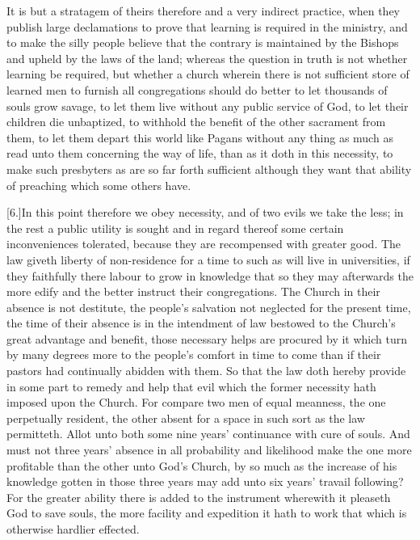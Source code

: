 It is but a stratagem of theirs therefore and a very indirect practice, when they publish large declamations to prove that learning is required in the ministry, and to make the silly people believe that the contrary is maintained by the Bishops and upheld by the laws of the land; whereas the question in truth is not whether learning be required, but whether a church wherein there is not sufficient store of learned men to furnish all congregations should do better to let thousands  of souls grow savage,
 to let them live without any public service of God, to let their children die unbaptized, to withhold the benefit of the other sacrament from them, to let them depart this world like Pagans without any thing as much as read unto them concerning the way of life, than as it doth in this necessity, to make such presbyters as are so far forth sufficient although they want that ability of preaching which some others have.

[6.]In this point therefore we obey necessity, and of two evils we take the less; in the rest a public utility is sought and in regard thereof some certain inconveniences tolerated, because they are recompensed with greater good. The law giveth liberty of non-residence for a time to such as will live in universities, if they faithfully there labour to grow in knowledge that so they may afterwards the more edify and the better instruct their congregations. The Church in their absence is not destitute, the people’s salvation not neglected for the present time, the time of their absence is in the intendment of law bestowed to the Church’s great advantage and benefit, those necessary helps are procured by it which turn by many degrees more to the people’s comfort in time to come than if their pastors had continually abidden with them. So that the law doth hereby provide in some part to remedy and help that evil which the former necessity hath imposed upon the Church. For compare two men of equal meanness, the one perpetually resident, the other absent for a space in such sort as the law permitteth. Allot unto both some nine years’ continuance with cure of souls. And must not three years’ absence in all probability and likelihood make the one more profitable than the other unto God’s Church, by so much as the increase of his knowledge gotten in those three years may add unto six years’ travail following? For the greater ability there is added to the instrument wherewith it pleaseth God to save souls, the more facility and expedition it hath to work that which is otherwise hardlier effected.

